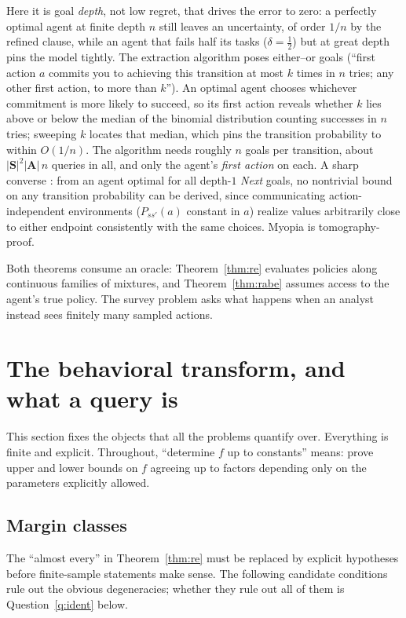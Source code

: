 \documentclass[11pt]{amsart}
\theoremstyle{plain}
\theoremstyle{definition}
\newcommand{\bS}{\mathbf{S}}
\newcommand{\bA}{\mathbf{A}}
\begin{document}
Here it is goal \emph{depth}, not low regret, that drives the error to zero: a perfectly optimal agent at finite depth $n$ still leaves an uncertainty, of order $1/n$ by the refined clause, while an agent that fails half its tasks ($\delta=\tfrac12$) but at great depth pins the model tightly. The extraction algorithm poses either--or goals (``first action $a$ commits you to achieving this transition at most $k$ times in $n$ tries; any other first action, to more than $k$''). An optimal agent chooses whichever commitment is more likely to succeed, so its first action reveals whether $k$ lies above or below the median of the binomial distribution counting successes in $n$ tries; sweeping $k$ locates that median, which pins the transition probability to within $O(1/n)$. The algorithm needs roughly $n$ goals per transition, about $|\bS|^2|\bA|\,n$ queries in all, and only the agent's \emph{first action} on each. A sharp converse \cite[Thm.~2]{richens2025}: from an agent optimal for all depth-$1$ \emph{Next} goals, no nontrivial bound on any transition probability can be derived, since communicating action-independent environments ($P_{ss'}(a)$ constant in $a$) realize values arbitrarily close to either endpoint consistently with the same choices. Myopia is tomography-proof.

Both theorems consume an oracle: Theorem~\ref{thm:re} evaluates policies along continuous families of mixtures, and Theorem~\ref{thm:rabe} assumes access to the agent's true policy. The survey problem asks what happens when an analyst instead sees finitely many sampled actions.

\section{The behavioral transform, and what a query is}\label{sec:setup}

This section fixes the objects that all the problems quantify over. Everything is finite and explicit. Throughout, ``determine $f$ up to constants'' means: prove upper and lower bounds on $f$ agreeing up to factors depending only on the parameters explicitly allowed.

\subsection{Margin classes}

The ``almost every'' in Theorem~\ref{thm:re} must be replaced by explicit hypotheses before finite-sample statements make sense. The following candidate conditions rule out the obvious degeneracies; whether they rule out all of them is Question~\ref{q:ident} below.
\end{document}
